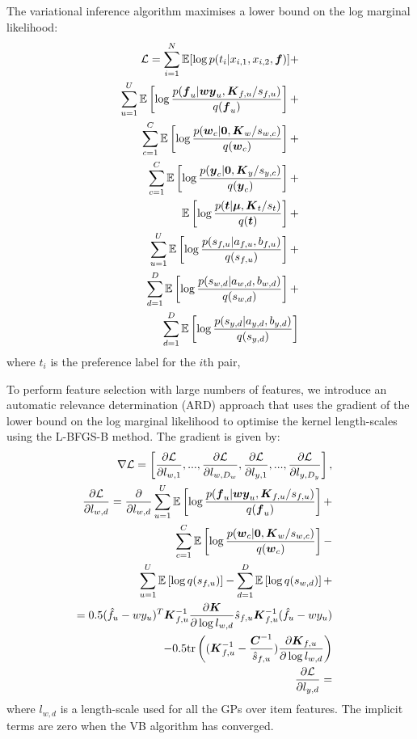 The variational inference algorithm maximises a lower bound on the log marginal likelihood:
\begin{eqnarray}
  \mathcal{L} = \sum_{i=1}^N \mathbb{E}[ \log p(t_i | x_{i,1}, x_{i,2}, \boldsymbol f) ] + \nonumber\\
  \sum_{u=1}^U  \mathbb{E}\left[ \log \frac{p(\boldsymbol f_u | \boldsymbol w \boldsymbol y_u, \boldsymbol K_{f,u} / s_{f,u} )}{q(\boldsymbol f_u)}\right] + \nonumber\\
  \sum_{c=1}^C \mathbb{E}\left[\log\frac{p(\boldsymbol w_c | \boldsymbol 0, \boldsymbol K_w / s_{w,c} ) }{q(\boldsymbol w_c) } \right] + \nonumber\\
  \sum_{c=1}^C \mathbb{E}\left[\log\frac{p(\boldsymbol y_c | \boldsymbol 0, \boldsymbol K_y / s_{y,c} ) }{q(\boldsymbol y_c) } \right] + \nonumber\\
  \mathbb{E}\left[\log\frac{p(\boldsymbol t | \boldsymbol \mu, \boldsymbol K_{t} / s_t ) }{q(\boldsymbol t)} \right] + \nonumber\\
  \sum_{u=1}^U \mathbb{E}\left[\log\frac{p(s_{f,u} | a_{f,u}, b_{f,u})}{q(s_{f,u})}\right] + \nonumber\\
  \sum_{d=1}^D \mathbb{E}\left[\log\frac{p(s_{w,d} | a_{w,d}, b_{w,d})}{q(s_{w,d})}\right] +\nonumber\\
  \sum_{d=1}^D \mathbb{E}\left[\log\frac{p(s_{y,d} | a_{y,d}, b_{y,d})}{q(s_{y,d})}\right] 
\end{eqnarray}
where $t_i$ is the preference label for the $i$th pair, 

To perform feature selection with large numbers of features, we introduce 
an automatic relevance determination
(ARD) approach that uses the gradient of the lower bound on the log marginal likelihood to optimise the kernel length-scales using the L-BFGS-B method\cite{??}. The gradient is given by:
\begin{eqnarray}
\nabla\mathcal{L} = \left[ \frac{\partial \mathcal{L}}{\partial l_{w,1}}, ...,  \frac{\partial \mathcal{L}}{\partial l_{w,D_w}},  \frac{\partial \mathcal{L}}{\partial l_{y,1}}, ...,  \frac{\partial \mathcal{L}}{\partial l_{y,D_y}} \right], &&\\
\frac{\partial \mathcal{L}}{\partial l_{w,d}} = \frac{\partial}{\partial l_{w,d}} 
\sum_{u=1}^U  \mathbb{E}\left[\log\frac{p(\boldsymbol f_u | \boldsymbol w \boldsymbol y_u, \boldsymbol K_{f,u} / s_{f,u} )}{q(\boldsymbol f_u)}\right] + \nonumber && \\
\sum_{c=1}^C \mathbb{E}\left[\log\frac{p(\boldsymbol w_c | \boldsymbol 0, \boldsymbol K_w / s_{w,c} ) }{q(\boldsymbol w_c) } \right] - \nonumber&&\\
\sum_{u=1}^U \mathbb{E}\left[\log q(s_{f,u})\right] - \sum_{d=1}^D \mathbb{E}\left[\log q(s_{w,d})\right] +\nonumber&&\\
= 0.5 (\hat{f}_u - wy_u)^T \boldsymbol K_{f,u}^{-1} \frac{\partial \boldsymbol K}{\partial \log l_{w,d}} \hat{s}_{f,u} \boldsymbol K_{f,u}^{-1} (\hat{f}_u - wy_u) \nonumber\\
- 0.5\mathrm{tr}\left( (\boldsymbol K_{f,u}^{-1} - \frac{\boldsymbol C^{-1}}{\hat{s}_{f,u}} ) \frac{\partial \boldsymbol K_{f,u}}{\partial \log l_{w,d}} \right)\nonumber&&\\
\frac{\partial \mathcal{L}}{\partial l_{y,d}} = &&\\
\end{eqnarray}
where $l_{w,d}$ is a length-scale used for all the GPs over item features. The implicit terms are zero when the VB algorithm has converged.
